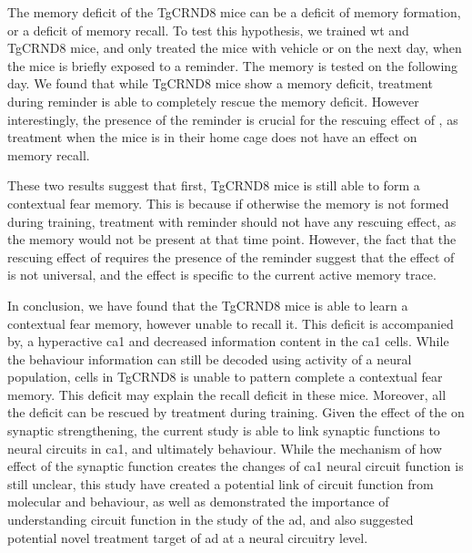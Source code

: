 The memory deficit of the TgCRND8 mice can be a deficit of memory formation, or a deficit of memory recall. To test this hypothesis, we trained \gls{wt} and TgCRND8 mice, and only treated the mice with vehicle or \tglu{} on the next day, when the mice is briefly exposed to a reminder. The memory is tested on the following day. We found that while TgCRND8 mice show a memory deficit, \tglu{} treatment during reminder is able to completely rescue the memory deficit. However interestingly, the presence of the reminder is crucial for the rescuing effect of \tglu, as \tglu{} treatment when the mice is in their home cage does not have an effect on memory recall. 

These two results suggest that first, TgCRND8 mice is still able to form a contextual fear memory. This is because if otherwise the memory is not formed during training, \tglu{} treatment with reminder should not have any rescuing effect, as the memory would not be present at that time point. However, the fact that the rescuing effect of \tglu{} requires the presence of the reminder suggest that the effect of \tglu{} is not universal, and the effect is specific to the current active memory trace. 

In conclusion, we have found that the TgCRND8 mice is able to learn a contextual fear memory, however unable to recall it. This deficit is accompanied by, a hyperactive \gls{ca1} and decreased information content in the \gls{ca1} cells. While the behaviour information can still be decoded using activity of a neural population, cells in TgCRND8 is unable to pattern complete a contextual fear memory. This deficit may explain the recall deficit in these mice. Moreover, all the deficit can be rescued by \tglu{} treatment during training. Given the effect of the \tglu{} on synaptic strengthening, the current study is able to link synaptic functions to neural circuits in \gls{ca1}, and ultimately behaviour. While the mechanism of how effect of the synaptic function creates the changes of \gls{ca1} neural circuit function is still unclear, this study have created a potential link of circuit function from molecular and behaviour, as well as demonstrated the importance of understanding circuit function in the study of the \gls{ad}, and also suggested potential novel treatment target of \gls{ad} at a neural circuitry level. 


